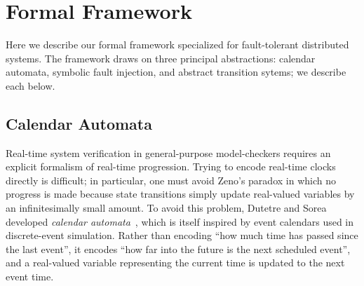 \documentclass{llncs/llncs}
\begin{document}




\section{Formal Framework}\label{sec:model}
Here we describe our formal framework specialized for fault-tolerant distributed systems. The framework draws on three principal abstractions: calendar automata, symbolic fault injection, and abstract transition sytems; we describe each below.

\subsection{Calendar Automata}\label{sec:calendar}

Real-time system verification in general-purpose model-checkers requires an explicit formalism of real-time progression. Trying to encode real-time clocks directly is difficult; in particular, one must avoid Zeno's paradox in which no progress is made because state transitions simply update real-valued variables by an infinitesimally small amount. To avoid this problem, Dutetre and Sorea developed \emph{calendar automata}~\cite{cal}, which is itself inspired by event calendars used in discrete-event simulation. Rather than encoding ``how much time has passed since the last event'', it encodes ``how far into the future is the next scheduled event'', and a real-valued variable representing the current time is updated to the next event time.
\end{document}
